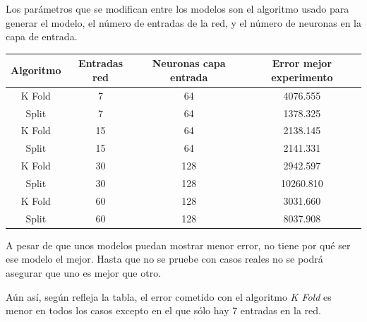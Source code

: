 \documentclass[12pt,a4paper, xcolor=table]{article}
\begin{document}
      Los parámetros que se modifican entre los modelos son el algoritmo usado para generar el modelo, el número de entradas de la red, y el número de neuronas en la capa de entrada.

      \begin{table}[h]
        \centering
      \begin{tabular}{|c|c|c|c|}
      \hline
      \rowcolor[HTML]{FFCE93}
      \textbf{Algoritmo} & \textbf{Entradas red} & \textbf{Neuronas capa entrada} & \textbf{Error mejor experimento} \\ \hline
      K Fold             & 7                     & 64                             & 4076.555                         \\ \hline
      Split              & 7                     & 64                             & 1378.325                         \\ \hline
      K Fold             & 15                    & 64                             & 2138.145                         \\ \hline
      Split              & 15                    & 64                             & 2141.331                         \\ \hline
      K Fold             & 30                    & 128                            & 2942.597                         \\ \hline
      Split              & 30                    & 128                            & 10260.810                        \\ \hline
      K Fold             & 60                    & 128                            & 3031.660                         \\ \hline
      Split              & 60                    & 128                            & 8037.908                         \\ \hline
    \end{tabular}
      \end{table}

    A pesar de que unos modelos puedan mostrar menor error, no tiene por qué ser ese modelo el mejor. Hasta que no se pruebe con casos reales no se podrá asegurar que uno es mejor que otro.

      \vspace{2mm}

    Aún así, según refleja la tabla, el error cometido con el algoritmo \textit{K Fold} es menor en todos los casos excepto en el que sólo hay 7 entradas en la red.
\end{document}
